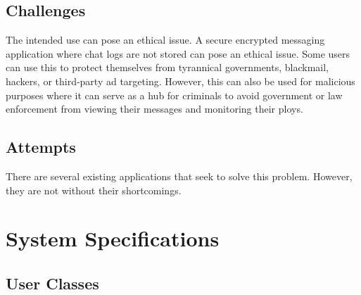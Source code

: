 \documentclass[11pt]{article}
\theoremstyle{plain}
\theoremstyle{definition}
\begin{document}
\subsection{Challenges}\label{sec:challenges}
The intended use can pose an ethical issue. A secure encrypted messaging application where chat logs are not stored can pose an ethical issue. Some users can use this to protect themselves from tyrannical governments, blackmail, hackers, or third-party ad targeting. However, this can also be used for malicious purposes where it can serve as a hub for criminals to avoid government or law enforcement from viewing their messages and monitoring their ploys.

\subsection{Attempts}\label{sec:attempts}
There are several existing applications that seek to solve this problem. However, they are not without their shortcomings.

\setlength{\tabcolsep}{4pt} %

\section{System Specifications}\label{sec:sysspecs}
\subsection{User Classes}\label{sec:userclasses}
\end{document}
